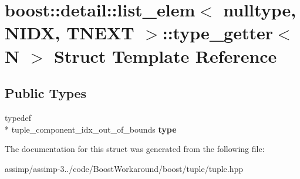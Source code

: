 \hypertarget{structboost_1_1detail_1_1list__elem_3_01nulltype_00_01_n_i_d_x_00_01_t_n_e_x_t_01_4_1_1type__getter}{\section{boost\+:\+:detail\+:\+:list\+\_\+elem$<$ nulltype, N\+I\+D\+X, T\+N\+E\+X\+T $>$\+:\+:type\+\_\+getter$<$ N $>$ Struct Template Reference}
\label{structboost_1_1detail_1_1list__elem_3_01nulltype_00_01_n_i_d_x_00_01_t_n_e_x_t_01_4_1_1type__getter}
}
\subsection*{Public Types}
\begin{DoxyCompactItemize}
\item 
\hypertarget{structboost_1_1detail_1_1list__elem_3_01nulltype_00_01_n_i_d_x_00_01_t_n_e_x_t_01_4_1_1type__getter_a0b72b15c3ff0363ef2c7b73d66be2482}{typedef \\*
tuple\+\_\+component\+\_\+idx\+\_\+out\+\_\+of\+\_\+bounds {\bfseries type}}\label{structboost_1_1detail_1_1list__elem_3_01nulltype_00_01_n_i_d_x_00_01_t_n_e_x_t_01_4_1_1type__getter_a0b72b15c3ff0363ef2c7b73d66be2482}

\end{DoxyCompactItemize}


The documentation for this struct was generated from the following file\+:\begin{DoxyCompactItemize}
\item 
assimp/assimp-\/3../code/\+Boost\+Workaround/boost/tuple/tuple.\+hpp\end{DoxyCompactItemize}
